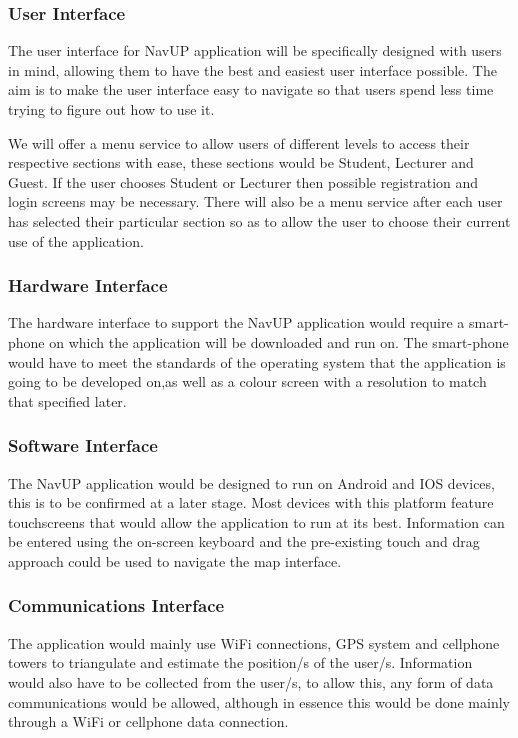 \subsubsection{User Interface}
The user interface for NavUP application will be specifically designed with users in mind, allowing them to have the best and easiest user interface possible. The aim is to make the user interface easy to navigate so that users spend less time trying to figure out how to use it.
\par
\bigskip
\noindent
We will offer a menu service to allow users of different levels to access their respective sections with ease, these sections would be Student, Lecturer and Guest. If the user chooses Student or Lecturer then possible registration and login screens may be necessary. There will also be a menu service after each user has selected their particular section so as to allow the user to choose their current use of the application. 

\subsubsection{Hardware Interface}
The hardware interface to support the NavUP application would require a smart-phone on which the application will be downloaded and run on. The smart-phone would have to meet the standards of the operating system that the application is going to be developed on,as well as a colour screen with a resolution to match that specified later. 

\subsubsection{Software Interface}
The NavUP application would be designed to run on Android and IOS devices, this is to be confirmed at a later stage. Most devices with this platform feature touchscreens that would allow the application to run at its best. Information can be entered using the on-screen keyboard and the pre-existing touch and drag approach could be used to navigate the map interface. 

\subsubsection{Communications Interface}
The application would mainly use WiFi connections, GPS system and cellphone towers to triangulate and estimate the position/s of the user/s. Information would also have to be collected from the user/s, to allow this, any form of data communications would be allowed, although in essence this would be done mainly through a WiFi or cellphone data connection. 